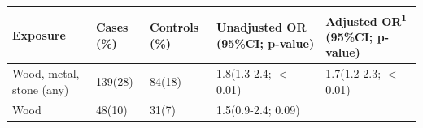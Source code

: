 \begin{longtable}[]{@{}lllll@{}}
\toprule
\begin{minipage}[b]{0.20\columnwidth}\raggedright
Exposure\strut
\end{minipage} & \begin{minipage}[b]{0.08\columnwidth}\raggedright
Cases (\%)\strut
\end{minipage} & \begin{minipage}[b]{0.10\columnwidth}\raggedright
Controls (\%)\strut
\end{minipage} & \begin{minipage}[b]{0.24\columnwidth}\raggedright
Unadjusted OR (95\%CI; p-value)\strut
\end{minipage} & \begin{minipage}[b]{0.24\columnwidth}\raggedright
Adjusted OR\textsuperscript{1} (95\%CI; p-value)\strut
\end{minipage}\tabularnewline
\midrule
\endhead
\begin{minipage}[t]{0.20\columnwidth}\raggedright
Wood, metal, stone (any)\strut
\end{minipage} & \begin{minipage}[t]{0.08\columnwidth}\raggedright
139(28)\strut
\end{minipage} & \begin{minipage}[t]{0.10\columnwidth}\raggedright
84(18)\strut
\end{minipage} & \begin{minipage}[t]{0.24\columnwidth}\raggedright
1.8(1.3-2.4; \ensuremath{<}0.01)\strut
\end{minipage} & \begin{minipage}[t]{0.24\columnwidth}\raggedright
1.7(1.2-2.3; \ensuremath{<}0.01)\strut
\end{minipage}\tabularnewline
\begin{minipage}[t]{0.20\columnwidth}\raggedright
Wood\strut
\end{minipage} & \begin{minipage}[t]{0.08\columnwidth}\raggedright
48(10)\strut
\end{minipage} & \begin{minipage}[t]{0.10\columnwidth}\raggedright
31(7)\strut
\end{minipage} & \begin{minipage}[t]{0.24\columnwidth}\raggedright
1.5(0.9-2.4; 0.09)\strut
\end{minipage} & \begin{minipage}[t]{0.24\columnwidth}\raggedright

\end{minipage}
\end{longtable}
